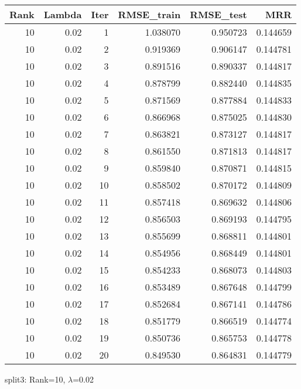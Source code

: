\begin{tabular}{rrrrrr}
\toprule
 Rank &  Lambda &  Iter &  RMSE\_train &  RMSE\_test &       MRR \\
\midrule
   10 &    0.02 &     1 &    1.038070 &   0.950723 &  0.144659 \\
   10 &    0.02 &     2 &    0.919369 &   0.906147 &  0.144781 \\
   10 &    0.02 &     3 &    0.891516 &   0.890337 &  0.144817 \\
   10 &    0.02 &     4 &    0.878799 &   0.882440 &  0.144835 \\
   10 &    0.02 &     5 &    0.871569 &   0.877884 &  0.144833 \\
   10 &    0.02 &     6 &    0.866968 &   0.875025 &  0.144830 \\
   10 &    0.02 &     7 &    0.863821 &   0.873127 &  0.144817 \\
   10 &    0.02 &     8 &    0.861550 &   0.871813 &  0.144817 \\
   10 &    0.02 &     9 &    0.859840 &   0.870871 &  0.144815 \\
   10 &    0.02 &    10 &    0.858502 &   0.870172 &  0.144809 \\
   10 &    0.02 &    11 &    0.857418 &   0.869632 &  0.144806 \\
   10 &    0.02 &    12 &    0.856503 &   0.869193 &  0.144795 \\
   10 &    0.02 &    13 &    0.855699 &   0.868811 &  0.144801 \\
   10 &    0.02 &    14 &    0.854956 &   0.868449 &  0.144801 \\
   10 &    0.02 &    15 &    0.854233 &   0.868073 &  0.144803 \\
   10 &    0.02 &    16 &    0.853489 &   0.867648 &  0.144799 \\
   10 &    0.02 &    17 &    0.852684 &   0.867141 &  0.144786 \\
   10 &    0.02 &    18 &    0.851779 &   0.866519 &  0.144774 \\
   10 &    0.02 &    19 &    0.850736 &   0.865753 &  0.144778 \\
   10 &    0.02 &    20 &    0.849530 &   0.864831 &  0.144779 \\
\bottomrule
\end{tabular}

\caption{split3: Rank=10, $\lambda$=0.02}
